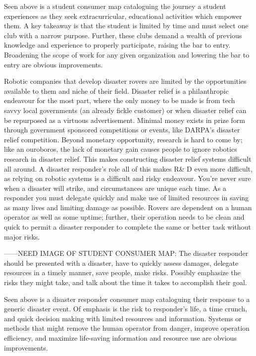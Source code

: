 \documentclass[a4paper, 10pt]{article}
\begin{document}
		Seen above is a student consumer map cataloguing the journey a student experiences as they seek extracurricular, educational activities which empower them. A key takeaway is that the student is limited by time and must select one club with a narrow purpose. Further, these clubs demand a wealth of previous knowledge and experience to properly participate, raising the bar to entry. Broadening the scope of work for any given organization and lowering the bar to entry are obvious improvements.
		
		Robotic companies that develop disaster rovers are limited by the opportunities available to them and niche of their field. Disaster relief is a philanthropic endeavour for the most part, where the only money to  be made is from tech savvy local governments (an already fickle customer) or when disaster relief can be repurposed as a virtuous advertisement. Minimal money exists in prize form through government sponsored competitions or events, like DARPA's disaster relief competition. Beyond monetary opportunity, research is hard to come by; like an ouroboros, the lack of monetary gain causes people to ignore robotics research in disaster relief. This makes constructing disaster relief systems difficult all around. A disaster responder's role all of this makes R\& D even more difficult, as relying on robotic systems is a difficult and risky endeavour. You're never sure when a disaster will strike, and circumstances are unique each time. As a responder you must delegate quickly and make use of limited resources in saving as many lives and limiting damage as possible. Rovers are dependent on a human operator as well as some uptime; further, their operation needs to be clean and quick to permit a disaster responder to complete the same or better task without major risks.
		
		------NEED IMAGE OF STUDENT CONSUMER MAP: The disaster responder should be presented with a disaster, have to quickly assess damages, delegate  resources in a timely manner, save people, make risks. Possibly emphasize the risks they might take, and talk about the time it takes to accomplish their goal. 
		
		Seen above is a disaster responder consumer map cataloguing their response to a generic disaster event. Of emphasis is the risk to responder's life, a time crunch, and quick decision making with limited resources and information. Systems or methods that might remove the human operator from danger, improve operation efficiency, and maximize life-saving information and resource use are obvious improvements.
		
\end{document}
